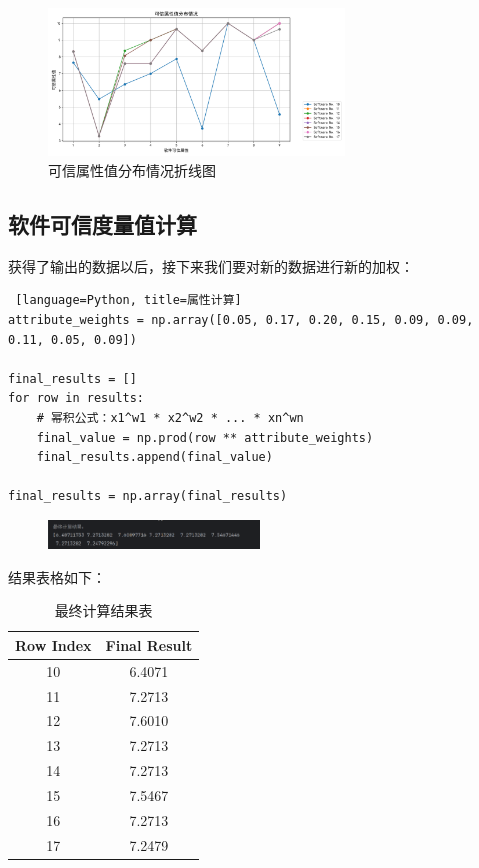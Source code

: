 \documentclass[14pt,a4paper,UTF8,twoside]{article}
\begin{document}
\begin{figure}[H]
	\centering
	\includegraphics[width=0.7\textwidth]{img7/plt1.png}
	\caption{可信属性值分布情况折线图}	
\end{figure}

\subsection{软件可信度量值计算}

获得了输出的数据以后，接下来我们要对新的数据进行新的加权：

\begin{lstlisting} [language=Python, title=属性计算]
attribute_weights = np.array([0.05, 0.17, 0.20, 0.15, 0.09, 0.09, 0.11, 0.05, 0.09])

final_results = []
for row in results:
    # 幂积公式：x1^w1 * x2^w2 * ... * xn^wn
    final_value = np.prod(row ** attribute_weights)
    final_results.append(final_value)

final_results = np.array(final_results)
\end{lstlisting}

\begin{figure}[H]
	\centering
	\includegraphics[width=0.5\textwidth]{img7/finalresult.png}
\end{figure}

结果表格如下：

\begin{table}[H]
	\centering
	\begin{tabular}{cc}
	\toprule
	\textbf{Row Index} & \textbf{Final Result} \\
	\midrule
	10 & 6.4071 \\
	11 & 7.2713 \\
	12 & 7.6010 \\
	13 & 7.2713 \\
	14 & 7.2713 \\
	15 & 7.5467 \\
	16 & 7.2713 \\
	17 & 7.2479 \\
	\bottomrule
	\end{tabular}
	\caption{最终计算结果表}
\end{table}
\end{document}

